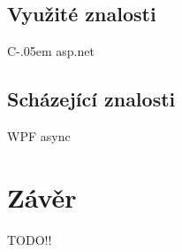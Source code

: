 \documentclass[czech,bachelor,dept460,male,csharp]{diploma}
\newcommand{\Csharp}{%
  {\settoheight{\dimen0}{C}C\kern-.05em \resizebox{!}{\dimen0}{\raisebox{\depth}{\#}}}}
\begin{document}
	\subsection{Využité znalosti}
		\Csharp
		asp.net
	\subsection{Scházející znalosti}
		WPF 
		async
\section{Závěr}
TODO!!


\printbibliography[title={Literatura}, heading=bibintoc]


\end{document}
